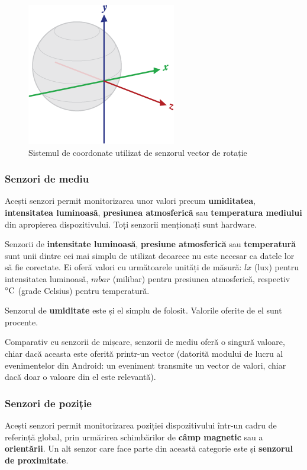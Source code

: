 \documentclass[12pt,a4paper]{article}
\begin{document}
\begin{figure}[hbtp]
\centering
\includegraphics[scale=0.8]{figures/axis_globe.png}
\caption{Sistemul de coordonate utilizat de senzorul vector de rotație}
\end{figure}


\subsubsection{Senzori de mediu}
Acești senzori permit monitorizarea unor valori precum \textbf{umiditatea}, \textbf{intensitatea luminoasă}, \textbf{presiunea atmosferică} sau \textbf{temperatura mediului} din apropierea dispozitivului. Toți senzorii menționați sunt hardware.

Senzorii de \textbf{intensitate luminoasă}, \textbf{presiune atmosferică} sau \textbf{temperatură} sunt unii dintre cei mai simplu de utilizat deoarece nu este necesar ca datele lor să fie corectate. Ei oferă valori cu următoarele unități de măsură: $lx$ (lux) pentru intensitatea luminoasă, $mbar$ (milibar) pentru presiunea atmosferică, respectiv $\celsius$ (grade Celsius) pentru temperatură.

Senzorul de \textbf{umiditate} este și el simplu de folosit. Valorile oferite de el sunt procente.

Comparativ cu senzorii de mișcare, senzorii de mediu oferă o singură valoare, chiar dacă aceasta este oferită printr-un vector (datorită modului de lucru al evenimentelor din Android: un eveniment transmite un vector de valori, chiar dacă doar o valoare din el este relevantă).

\subsubsection{Senzori de poziție}
Acești senzori permit monitorizarea poziției dispozitivului într-un cadru de referință global, prin urmărirea schimbărilor de \textbf{câmp magnetic} sau a \textbf{orientării}. Un alt senzor care face parte din această categorie este și  \textbf{senzorul de proximitate}.
\end{document}
